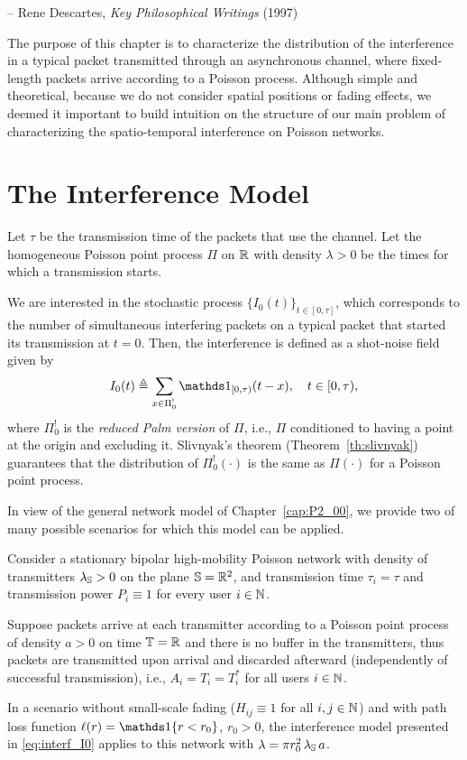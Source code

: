 {-- Rene Descartes, \textit{Key Philosophical Writings} (1997)}

The purpose of this chapter is to characterize the distribution of the interference in a typical packet transmitted through an asynchronous channel, where fixed-length packets arrive according to a Poisson process.
%
Although simple and theoretical, because we do not consider spatial positions or fading effects, we deemed it important to build intuition on the structure of our main problem of characterizing the spatio-temporal interference on Poisson networks.

\newpage

\section{The Interference Model}

Let $\tau$ be the transmission time of the packets that use the channel. Let the homogeneous Poisson point process $\Pi$ on $\R$ with density $\lambda > 0$ be the times for which a transmission starts.

We are interested in the stochastic process $\{I_0(t)\}_{t\in[0,\tau]}$, which corresponds to the number of simultaneous interfering packets on a typical packet that started its transmission at $t=0$. Then, the interference is defined as a shot-noise field given by
\begin{align} \label{eq:interf_I0}
    I_0(t) \triangleq \sum_{x\in\Pi^!_0} \ind_{[0,\tau)}(t-x), \quad t\in[0,\tau),
\end{align}
where $\Pi^!_0$ is the \textit{reduced Palm version} of $\Pi$, i.e., $\Pi$ conditioned to having a point at the origin and excluding it.
%
Slivnyak's theorem (Theorem~\ref{th:slivnyak}) guarantees that the distribution of $\Pi^!_0(\cdot)$ is the same as $\Pi(\cdot)$ for a Poisson point process.

In view of the general network model of Chapter~\ref{cap:P2_00}, we provide two of many possible scenarios for which this model can be applied.

\begin{example}
    Consider a stationary bipolar high-mobility Poisson network with density of transmitters $\lambda_{\S}>0$ on the plane $\S=\R^2$, and transmission time $\tau_i = \tau$ and transmission power $P_i \equiv 1$ for every user $i\in\N$.
    
    Suppose packets arrive at each transmitter according to a Poisson point process of density $a>0$ on time $\T = \R$ and there is no buffer in the transmitters, thus packets are transmitted upon arrival and discarded afterward (independently of successful transmission), i.e., $A_{i} = T_{i} = T^*_{i}$ for all users $i\in\N$.
    
    In a scenario without small-scale fading ($H_{ij} \equiv 1$ for all $i,j\in\N$) and with path loss function $\ell(r) = \ind\{r < r_0\}$, $r_0>0$,
    the interference model presented in \eqref{eq:interf_I0} applies to this network with $\lambda = \pi r_0^2\,\lambda_\S\,a$.
\end{example}

